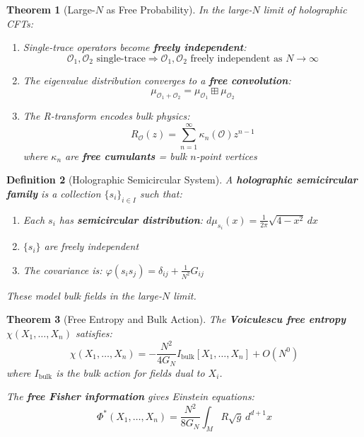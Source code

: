 \documentclass[12pt,a4paper]{article}
\newtheorem{theorem}{Theorem}[section]
\newtheorem{definition}[theorem]{Definition}
\begin{document}
\begin{theorem}[Large-$N$ as Free Probability]\label{thm:large-n-free}
In the large-$N$ limit of holographic CFTs:
\begin{enumerate}
    \item Single-trace operators become \textbf{freely independent}:
    \begin{equation}
    \mathcal{O}_1, \mathcal{O}_2 \text{ single-trace} \Rightarrow \mathcal{O}_1, \mathcal{O}_2 \text{ freely independent as } N \to \infty
    \end{equation}
    
    \item The eigenvalue distribution converges to a \textbf{free convolution}:
    \begin{equation}
    \mu_{\mathcal{O}_1 + \mathcal{O}_2} = \mu_{\mathcal{O}_1} \boxplus \mu_{\mathcal{O}_2}
    \end{equation}
    
    \item The R-transform encodes bulk physics:
    \begin{equation}
    R_{\mathcal{O}}(z) = \sum_{n=1}^\infty \kappa_n(\mathcal{O}) z^{n-1}
    \end{equation}
    where $\kappa_n$ are \textbf{free cumulants} = bulk $n$-point vertices
\end{enumerate}
\end{theorem}

\begin{definition}[Holographic Semicircular System]\label{def:holo-semicircle}
A \textbf{holographic semicircular family} is a collection $\{s_i\}_{i \in I}$ such that:
\begin{enumerate}
    \item Each $s_i$ has \textbf{semicircular distribution}: $d\mu_{s_i}(x) = \frac{1}{2\pi}\sqrt{4-x^2} \, dx$
    \item $\{s_i\}$ are freely independent
    \item The covariance is: $\varphi(s_i s_j) = \delta_{ij} + \frac{1}{N^2} G_{ij}$
\end{enumerate}

These model bulk fields in the large-$N$ limit.
\end{definition}

\begin{theorem}[Free Entropy and Bulk Action]\label{thm:free-entropy-bulk}
The \textbf{Voiculescu free entropy} $\chi(X_1, \ldots, X_n)$ satisfies:
\begin{equation}
\chi(X_1, \ldots, X_n) = -\frac{N^2}{4G_N} I_{\text{bulk}}[X_1, \ldots, X_n] + O(N^0)
\end{equation}
where $I_{\text{bulk}}$ is the bulk action for fields dual to $X_i$.

The \textbf{free Fisher information} gives Einstein equations:
\begin{equation}
\Phi^*(X_1, \ldots, X_n) = \frac{N^2}{8G_N} \int_M R \sqrt{g} \, d^{d+1}x
\end{equation}
\end{theorem}
\end{document}
